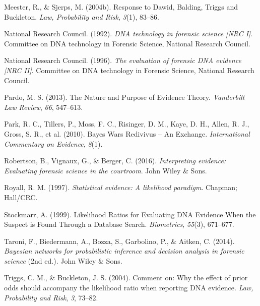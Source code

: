 \documentclass[10pt,dvipsnames,enabledeprecatedfontcommands]{scrartcl}
\begin{document}
\leavevmode\hypertarget{ref-meester2004ResponseDawidBalding}{}%
Meester, R., \& Sjerps, M. (2004b). Response to Dawid, Balding, Triggs
and Buckleton. \emph{Law, Probability and Risk}, \emph{3}(1), 83--86.

\leavevmode\hypertarget{ref-NRCI1992}{}%
National Research Council. (1992). \emph{DNA technology in forensic
science \textup{{[}NRC I{]}}}. Committee on DNA technology in Forensic
Science, National Research Council.

\leavevmode\hypertarget{ref-NRCII1996}{}%
National Research Council. (1996). \emph{The evaluation of forensic DNA
evidence \textup{{[}NRC II{]}}}. Committee on DNA technology in Forensic
Science, National Research Council.

\leavevmode\hypertarget{ref-pardo2013NaturePurposeEvidence}{}%
Pardo, M. S. (2013). The Nature and Purpose of Evidence Theory.
\emph{Vanderbilt Law Review}, \emph{66}, 547--613.

\leavevmode\hypertarget{ref-park2010BayesWarsRedivivus}{}%
Park, R. C., Tillers, P., Moss, F. C., Risinger, D. M., Kaye, D. H.,
Allen, R. J., Gross, S. R., et al. (2010). Bayes Wars Redivivus -- An
Exchange. \emph{International Commentary on Evidence}, \emph{8}(1).

\leavevmode\hypertarget{ref-robertson2016interpreting}{}%
Robertson, B., Vignaux, G., \& Berger, C. (2016). \emph{Interpreting
evidence: Evaluating forensic science in the courtroom}. John Wiley \&
Sons.

\leavevmode\hypertarget{ref-Royall1997}{}%
Royall, R. M. (1997). \emph{Statistical evidence: A likelihood
paradigm}. Chapman; Hall/CRC.

\leavevmode\hypertarget{ref-stockmarr1999LikelihoodRatiosEvaluating}{}%
Stockmarr, A. (1999). Likelihood Ratios for Evaluating DNA Evidence When
the Suspect is Found Through a Database Search. \emph{Biometrics},
\emph{55}(3), 671--677.

\leavevmode\hypertarget{ref-taroni2006bayesian}{}%
Taroni, F., Biedermann, A., Bozza, S., Garbolino, P., \& Aitken, C.
(2014). \emph{Bayesian networks for probabilistic inference and decision
analysis in forensic science} (2nd ed.). John Wiley \& Sons.

\leavevmode\hypertarget{ref-triggsCommentWhyEffecta}{}%
Triggs, C. M., \& Buckleton, J. S. (2004). Comment on: Why the effect of
prior odds should accompany the likelihood ratio when reporting DNA
evidence. \emph{Law, Probability and Risk}, \emph{3}, 73--82.
\end{document}

